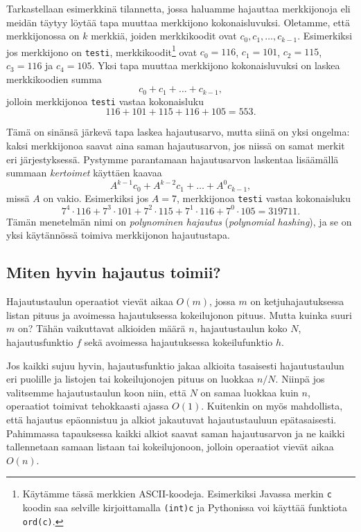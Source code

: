 Tarkastellaan esimerkkinä tilannetta, jossa haluamme hajauttaa merkkijonoja
eli mei\-dän täytyy löytää tapa muuttaa merkkijono kokonaisluvuksi.
Oletamme, että merkkijonossa on $k$ merkkiä,
joiden merkkikoodit ovat $c_0,c_1,\dots,c_{k-1}$.
Esimerkiksi jos merkkijono on \texttt{testi},
merkkikoodit\footnote{Käytämme tässä merkkien ASCII-koodeja.
Esimerkiksi Javassa merkin \texttt{c} koodin saa
selville kirjoittamalla \texttt{(int)c}
ja Pythonissa voi käyttää funktiota \texttt{ord(c)}.} ovat $c_0=116$, $c_1=101$, $c_2=115$,
$c_3=116$ ja $c_4=105$.
Yksi tapa muuttaa merkkijono kokonaisluvuksi
on laskea merkkikoodien summa
\[ c_0 + c_1 + \dots + c_{k-1},\]
jolloin merkkijonoa \texttt{testi} vastaa kokonaisluku
\[116+101+115+116+105=553.\]


Tämä on sinänsä järkevä tapa laskea hajautusarvo, mutta siinä on yksi ongelma:
kaksi merkkijonoa saavat aina saman hajautusarvon,
jos niissä on samat merkit eri järjestyksessä.
Pystymme parantamaan hajautusarvon laskentaa lisäämällä
summaan \emph{kertoimet} käyttäen kaavaa
\[ A^{k-1} c_0 + A^{k-2} c_1 + \dots + A^0 c_{k-1},\]
missä $A$ on vakio.
Esimerkiksi jos $A=7$, merkkijonoa \texttt{testi} vastaa kokonaisluku
\[7^4 \cdot 116+7^3 \cdot 101+7^2 \cdot 115+7^1 \cdot 116+7^0 \cdot 105=319711.\]
Tämän menetelmän nimi on \emph{polynominen hajautus}
(\emph{polynomial hashing}),
ja se on yksi käytännössä toimiva merkkijonon hajautustapa.

\subsection{Miten hyvin hajautus toimii?}

Hajautustaulun operaatiot vievät aikaa $O(m)$,
jossa $m$ on ketjuhajautuksessa listan pituus
ja avoimessa hajautuksessa kokeilujonon pituus.
Mutta kuinka suuri $m$ on? Tähän vaikuttavat
alkioiden määrä $n$, hajautustaulun koko $N$,
hajautusfunktio $f$ sekä avoimessa hajautuksessa
kokeilufunktio $h$.

Jos kaikki sujuu hyvin, hajautusfunktio jakaa alkioita
tasaisesti hajautustaulun eri puolille
ja listojen tai kokeilujonojen pituus on luokkaa $n/N$.
Niinpä jos valitsemme hajautustaulun koon niin,
että $N$ on samaa luokkaa kuin $n$,
operaatiot toimivat tehokkaasti ajassa $O(1)$.
Kuitenkin on myös mahdollista, että hajautus epäonnistuu
ja alkiot jakautuvat hajautustauluun epätasaisesti.
Pahimmassa tapauksessa kaikki alkiot saavat saman
hajautusarvon ja ne kaikki tallennetaan samaan listaan
tai kokeilujonoon, jolloin operaatiot vievät aikaa $O(n)$.

